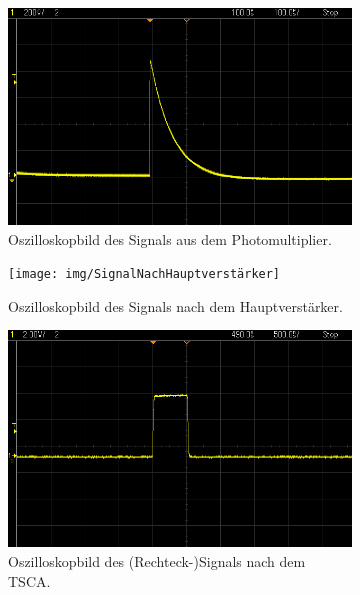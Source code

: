 \begin{figure}[H]
	\centering
	\begin{subfigure}[t]{0.495\textwidth}
		\centering
		\includegraphics[width=\textwidth]{img/SignalNachPhotomultiplier}
		\caption{Oszilloskopbild des Signals aus dem Photomultiplier.}
		\label{SignalNachPhotomultiplier}
	\end{subfigure}
	\begin{subfigure}[t]{0.495\textwidth}
		\centering
		\texttt{[image: img/SignalNachHauptverstärker]}
		\caption{Oszilloskopbild des Signals nach dem Hauptverstärker.}
		\label{SignalNachHauptverstärker}
	\end{subfigure}
	\begin{subfigure}[t]{0.495\textwidth}
		\centering
		\includegraphics[width=\textwidth]{img/SignalNachTSCA}
		\caption{Oszilloskopbild des (Rechteck-)Signals nach dem TSCA.}
		\label{SignalNachTSCA}
	\end{subfigure}
	\begin{subfigure}[t]{0.495\textwidth}

\end{subfigure}
\end{figure}
